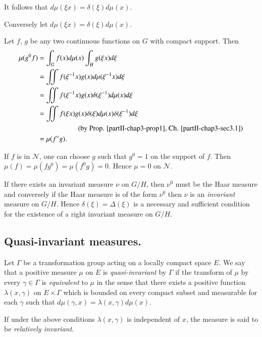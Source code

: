 It follows that $d\mu (\xi x)=\delta (\xi)  d\mu (x)$.

Conversely let $d\mu (\xi x)=\delta (\xi) d\mu (x)$.

Let $f$, $g$ be any two continuous functions on $G$ with compact
support. Then
\begin{align*}
\mu (g^0 f) &= \int_{G} f(x)d \mu (x) \int_{H} g(\xi x) d \xi\\ 
				&= \iint f( \xi^{-1} x) g (x) d \mu
(\xi^{-1} x) d \xi\\ 
				&=\iint  f(\xi^{-1}x) g (x)
\delta(\xi^{-1}) d\mu (x) d \xi\\ 
				&=\iint  f(\xi x) g (x) \delta (\xi) d
\mu (x) \delta (\xi^{-1})d \xi\\ 
				& \hspace{2cm} \text{(by
  Prop. \ref{partII-chap3-prop1},   Ch. \ref{partII-chap3-sec3.1})}\\ 
				&=\mu (f^\circ g). 
\end{align*}

If $f$ is in $\mathscr{N}$, one can choose $g$ such that $g^0=1$ on the
support of $f$. Then $\mu(f)= \mu (fg^0)=\mu (f^0
g)=0$. Hence $\mu=0$ on $\mathscr{N}$. 

If there exists an invariant measure $\nu$ on $G/H$, then $\nu^0$
must be the Haar measure and conversely if the Haar measure is of the
form $\nu^0$  then $\nu$ is an \textit{invariant} measure on
$G/H$. Hence $\delta (\xi)=\Delta  (\xi)$ is a necessary and
sufficient condition for the existence of a right invariant measure on
$G/H$. 
 
\subsection{Quasi-invariant
  measures.}\label{partII-chap3-sec3.4}\pageoriginale%

\begin{defi*} %
Let $\Gamma$ be a transformation group acting on a locally compact
space $E$. We say that a positive measure $\mu$ on $E$ is {\em
  quasi-invariant} by $\Gamma$ if the transform of $\mu$ by 
every $\gamma \in \Gamma$  is {\em equivalent} to $\mu$
in the sense that there exists a positive function $\lambda
(x,\gamma)$ on $E\times \Gamma$ which is bounded on every
compact subset and measurable for each $\gamma$ such that $d\mu
(\gamma,x)=\lambda (x,\gamma) d \mu (x)$. 
\end{defi*}

If under the above conditions $\lambda (x,\gamma)$ is independent of
$x$, the measure is said to be \textit{relatively invariant}. 

